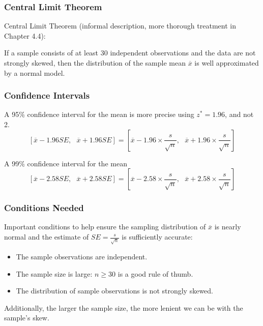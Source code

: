 \documentclass[handout]{beamer}
\newcommand{\blue}[1]{\textcolor{blue2}{#1}}
\newcommand{\xbar}{\overline{x}}
\begin{document}
\begin{frame}
\frametitle{Central Limit Theorem}

\pause \blue{Central Limit Theorem} (informal description, more thorough treatment in Chapter 4.4):\\

\vspace{0.5cm}

\pause If a sample consists of at least 30 independent observations and the data are not
strongly skewed, then the distribution of the sample mean $\xbar$ is well approximated by
a \blue{normal model}.


\end{frame}



\begin{frame}
\frametitle{Confidence Intervals}

A 95\% confidence interval for the mean is more precise using $z^* = 1.96$, and not 2.  
\[
\left[\xbar - 1.96 SE, \mbox{  }\xbar + 1.96 SE\right] = 
\left[
\overline{x} - 1.96 \times\frac{s}{\sqrt n}, \mbox{  }
\overline{x} + 1.96 \times\frac{s}{\sqrt n}
\right]
\]


\pause A 99\% confidence interval for the mean
\[
\left[\xbar - 2.58 SE, \mbox{  }\xbar + 2.58 SE\right] = 
\left[
\overline{x} - 2.58 \times\frac{s}{\sqrt n}, \mbox{  }
\overline{x} + 2.58 \times\frac{s}{\sqrt n}
\right]
\]


\end{frame}





\begin{frame}
\frametitle{Conditions Needed}
Important conditions to help ensure the sampling distribution of $\xbar$ is nearly normal
and the estimate of $SE=\frac{s}{\sqrt n}$ is sufficiently accurate:
\begin{itemize}
\pause \item The sample observations are independent.
\pause \item The sample size is large: $n \geq 30$ is a good rule of thumb.
\pause \item The distribution of sample observations is not strongly skewed.
\end{itemize}

\pause Additionally, the larger the sample size, the more lenient we can be with the
sample's skew.

\end{frame}
\end{document}
